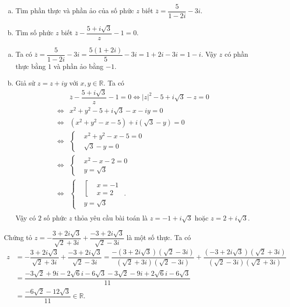 \begin{bt}%
	\begin{enumerate}[a)]
		\item Tìm phần thực và phần ảo của số phức $z$ biết $\overline{z} = \dfrac{5}{1-2i} - 3i$.
		\item Tìm số phức $z$ biết $\overline{z} - \dfrac{5+i\sqrt{3}}{z} - 1 = 0$.
	\end{enumerate}
	\loigiai
	{
		\begin{enumerate}[a)]
			\item Ta có $\overline{z} = \dfrac{5}{1-2i} - 3i = \dfrac{5(1+2i)}{5} - 3i = 1+2i-3i = 1-i$. Vậy $z$ có phần thực bằng $1$ và phần ảo bằng $-1$.
			\item Giả sử $z = z+iy$ với $x,y \in \mathbb{R}$. Ta có
			\begin{align*}
			&\overline{z} - \dfrac{5+i\sqrt{3}}{z} - 1 = 0 \Leftrightarrow |z|^2 - 5+i\sqrt{3} - z = 0 \\
			\Leftrightarrow & x^2+y^2-5+i\sqrt{3}-x-iy = 0 \\
			\Leftrightarrow &\left(x^2+y^2-x-5\right) + i \left(\sqrt{3} - y\right) = 0 \\
			\Leftrightarrow &\left\{\begin{aligned} &x^2+y^2-x-5=0 \\ &\sqrt{3} - y=0 \end{aligned}\right. \\
			\Leftrightarrow &\left\{\begin{aligned} &x^2-x-2=0 \\ &y=\sqrt{3} \end{aligned}\right. \\
			\Leftrightarrow &\left\{\begin{aligned} &\left[\begin{aligned} &x=-1 \\ &x=2 \end{aligned}\right. \\ &y=\sqrt{3} \end{aligned}\right..\\
			\end{align*}
			Vậy có $2$ số phức $z$ thỏa yêu cầu bài toán là $z=-1+i\sqrt{3}$ hoặc $z=2+i\sqrt{3}$.
		\end{enumerate}
	}
\end{bt}

\begin{bt}%
	Chứng tỏ $z = - \dfrac{3+2i\sqrt{3}}{\sqrt{2}+3i} + \dfrac{-3+2i\sqrt{3}}{\sqrt{2} - 3i}$ là một số thực.
	\loigiai 
	{
		Ta có
		\begin{align*}
		z &=  - \dfrac{3+2i\sqrt{3}}{\sqrt{2}+3i} + \dfrac{-3+2i\sqrt{3}}{\sqrt{2} - 3i} = \dfrac{-(3 + 2i \sqrt{3})(\sqrt{2} - 3i)}{(\sqrt{2} + 3i)(\sqrt{2} - 3i)} + \dfrac{(-3 + 2i \sqrt{3})(\sqrt{2} + 3i)}{(\sqrt{2} - 3i)(\sqrt{2} + 3i)} \\
		&= \dfrac{-3\sqrt{2} + 9i -2\sqrt{6}i - 6\sqrt{3} - 3\sqrt{2} - 9i + 2\sqrt{6}i  - 6\sqrt{3}}{11} \\
		&= \dfrac{-6\sqrt{2} - 12\sqrt{3}}{11} \in \mathbb{R}.
		\end{align*}
	}
\end{bt}

